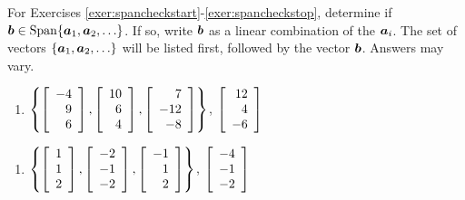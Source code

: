 \noindent For Exercises \ref{exer:spancheckstart}-\ref{exer:spancheckstop}, determine if $\bb b \in \Span\{\bb a_1, \bb a_2, \ldots\}$. If so, write $\bb b$ as a linear combination of the $\bb a_i$.  The set of vectors $\{\bb a_1, \bb a_2,\ldots\}$ will be listed first, followed by the vector $\bb b$. Answers may vary.
\begin{enumerate}[!HW!]
\item\label{exer:spancheckstart} $\left\{\vr{-4\\9\\6}, \vr{10\\6\\4}, \vr{7\\-12\\-8}\right\}$, $\vr{12\\4\\-6}$ %
\end{enumerate}
\begin{enumerate}[!HW!, label=$\spadesuit$ \arabic*., ref=\arabic*]
\item\label{exer:spancheckstop} $\left\{\vr{1\\1\\2}, \vr{-2\\-1\\-2}, \vr{-1\\1\\2}\right\}$, $\vr{-4\\-1\\-2}$ %
\end{enumerate}

